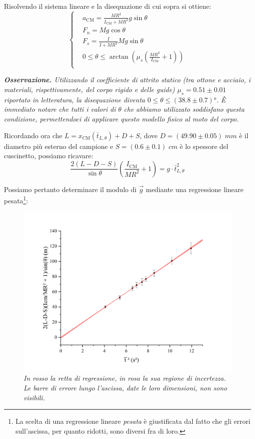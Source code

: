 \documentclass{article}
\begin{document}
Risolvendo il sistema lineare e la disequazione di cui sopra si ottiene:
\[\left\{\begin{aligned}
    &a_\text{CM} = \frac{M R^2}{I_\text{CM} + M R^2} g\sin\theta \\
    &F_n = M g \cos\theta \\
    &F_s = \frac{I}{I + M R^2} M g \sin\theta \\
    & 0 \le \theta \le \arctan\left(\mu_s \left(\frac{MR^2}{I_\text{CM}} + 1\right)\right) \\
\end{aligned}\right.\]

\emph{\textbf{Osservazione.}
    Utilizzando il coefficiente di attrito statico (tra ottone e acciaio,
    i materiali, rispettivamente, del corpo rigido e delle guide)
    $\mu_s = 0.51\pm0.01$ riportato in letteratura,
    la disequazione diventa $0 \le \theta \le (38.8 \pm 0.7)\unit{\degree}$.
    È immediato notare che tutti i valori di $\theta$ che abbiamo utilizzato
    soddisfano questa condizione, permettendoci di applicare questo
    modello fisico al moto del corpo.
}

Ricordando ora che $L = x_\text{CM}(\bar{t}_{L,\theta}) + D + S$,
dove $D = (49.90\pm0.05)\;\unit{mm}$ è il diametro più esterno del campione e
$S = (0.6\pm0.1)\;\unit{cm}$ è lo spessore del cuscinetto, possiamo ricavare:
\[
    \frac{2(L-D-S)}{\sin\theta}\left(\frac{I_\text{CM}}{M R^2} + 1\right) = g \cdot \bar{t}_{L,\theta}^2
\]

Possiamo pertanto determinare il modulo di $\vec{g}$ mediante una regressione
lineare pesata\footnote[2]{
    La scelta di una regressione lineare \emph{pesata} è giustificata dal fatto
    che gli errori sull'ascissa, per quanto ridotti, sono diversi fra di loro.
}:
\begin{figure}[H]
    \includegraphics[trim={1cm 0.6cm 1cm 1cm},clip,width=\textwidth]{img/regressione.jpg}
    \caption*{\emph{
        In rosso la retta di regressione, in rosa la sua regione di incertezza. \\
        Le barre di errore lungo l'ascissa, date le loro dimensioni, non sono visibili.
    }}
\end{figure}
\end{document}
